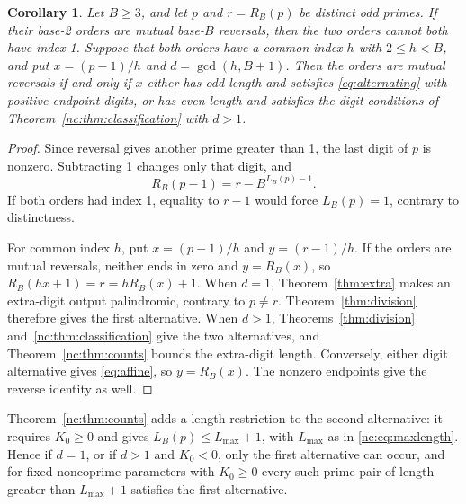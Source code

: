 \documentclass[11pt]{amsart}
\newtheorem{corollary}[theorem]{Corollary}
\theoremstyle{remark}\newtheorem{remark}[theorem]{Remark}
\newcommand{\rev}{R}
\begin{document}
\begin{corollary}\label{cor:indices}
Let $B\ge3$, and let $p$ and $r=\rev_B(p)$ be distinct odd primes.
If their base-2 orders are mutual base-$B$ reversals, then the two orders cannot both have index 1.
Suppose that both orders have a common index $h$ with $2\le h<B$, and put $x=(p-1)/h$ and $d=\gcd(h,B+1)$. Then the orders are mutual reversals if and only if $x$ either has odd length and satisfies \eqref{eq:alternating} with positive endpoint digits, or has even length and satisfies the digit conditions of Theorem~\ref{nc:thm:classification} with $d>1$.
\end{corollary}
\begin{proof}
Since reversal gives another prime greater than 1, the last digit of $p$ is nonzero.
Subtracting 1 changes only that digit, and
\[
 \rev_B(p-1)=r-B^{L_B(p)-1}.
\]
If both orders had index 1, equality to $r-1$ would force $L_B(p)=1$, contrary to distinctness.

For common index $h$, put $x=(p-1)/h$ and $y=(r-1)/h$.
If the orders are mutual reversals, neither ends in zero and $y=\rev_B(x)$, so
$\rev_B(hx+1)=r=h\rev_B(x)+1$.
When $d=1$, Theorem~\ref{thm:extra} makes an extra-digit output palindromic, contrary to $p\ne r$. Theorem~\ref{thm:division} therefore gives the first alternative. When $d>1$, Theorems~\ref{thm:division} and~\ref{nc:thm:classification} give the two alternatives, and Theorem~\ref{nc:thm:counts} bounds the extra-digit length. Conversely, either digit alternative gives \eqref{eq:affine}, so $y=\rev_B(x)$.
The nonzero endpoints give the reverse identity as well.
\end{proof}

Theorem~\ref{nc:thm:counts} adds a length restriction to the second alternative: it requires $K_0\ge0$ and gives $L_B(p)\le L_{\max}+1$, with $L_{\max}$ as in \eqref{nc:eq:maxlength}. Hence if $d=1$, or if $d>1$ and $K_0<0$, only the first alternative can occur, and for fixed noncoprime parameters with $K_0\ge0$ every such prime pair of length greater than $L_{\max}+1$ satisfies the first alternative.
\end{document}
